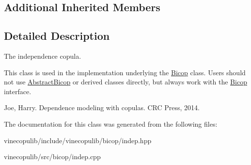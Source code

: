 \subsection*{Additional Inherited Members}


\subsection{Detailed Description}
The independence copula. 

This class is used in the implementation underlying the \hyperlink{classvinecopulib_1_1_bicop}{Bicop} class. Users should not use \hyperlink{classvinecopulib_1_1_abstract_bicop}{Abstract\+Bicop} or derived classes directly, but always work with the \hyperlink{classvinecopulib_1_1_bicop}{Bicop} interface.

Joe, Harry. Dependence modeling with copulas. C\+R\+C Press, 2014. 

The documentation for this class was generated from the following files\+:\begin{DoxyCompactItemize}
\item 
vinecopulib/include/vinecopulib/bicop/indep.\+hpp\item 
vinecopulib/src/bicop/indep.\+cpp\end{DoxyCompactItemize}
